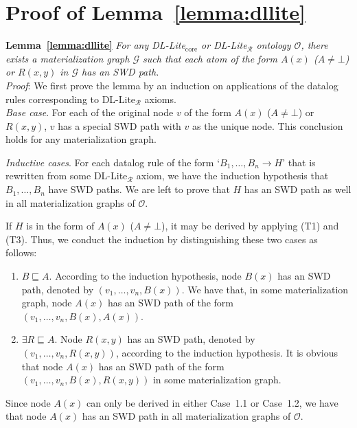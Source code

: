 \section{Proof of Lemma~\ref{lemma:dllite}}

\textbf{Lemma~\ref{lemma:dllite}}
\emph{For any DL-Lite$_{\text{core}}$ or DL-Lite$_\mathcal{R}$ ontology $\mathcal{O}$, there exists a materialization graph $\mathcal{G}$ such that
each atom of the form $A(x)$ ($A\neq\bot$) or $R(x,y)$ in $\mathcal{G}$ has an SWD path.}\\

\noindent\emph{Proof}: We first prove the lemma by an induction on applications of
the datalog rules corresponding to DL-Lite$_\mathcal{R}$ axioms.\\

\emph{Base case}. For each of the original node $v$ of the form $A(x)$ ($A\neq\bot$) or $R(x,y)$,
$v$ has a special SWD path with $v$ as the unique node. This conclusion holds
for any materialization graph.

\emph{Inductive cases}. For each datalog rule of the form `$B_1,\ldots ,B_n\rightarrow H$'
that is rewritten from some DL-Lite$_\mathcal{R}$ axiom, we have the induction hypothesis
that $B_1,\ldots ,B_n$ have SWD paths.
We are left to prove that $H$ has an SWD path as well
in all materialization graphs of $\mathcal{O}$.

If $H$ is in the form of $A(x)$ ($A\neq\bot$), it may be derived by
applying (T1) and (T3). Thus, we conduct the induction by
distinguishing these two cases as follows:

\begin{enumerate}[leftmargin=12ex,label=Case~1.\arabic*]
\item $B\sqsubseteq A$. According to the induction hypothesis,
node $B(x)$ has an SWD path, denoted by $(v_1,\ldots ,v_n,B(x))$.
We have that, in some materialization graph, node $A(x)$
has an SWD path of the form $(v_1,\ldots ,v_n,B(x),A(x))$.

\item $\exists R\sqsubseteq A$. Node $R(x,y)$ has an SWD path,
denoted by $(v_1,\ldots ,v_n,R(x,y))$,
according to the induction hypothesis.
It is obvious that node $A(x)$
has an SWD path of the form $(v_1,\ldots ,v_n,B(x),R(x,y))$
in some materialization graph.
\end{enumerate}

Since node $A(x)$ can only be derived in either Case~1.1
or Case~1.2, we have that
node $A(x)$ has an SWD path in all materialization graphs of $\mathcal{O}$.

